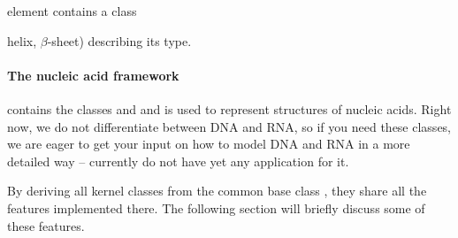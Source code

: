 element contains a class {\eg helix, $\beta$-sheet) describing its type.

\paragraph{The nucleic acid framework} contains the classes 
and  and is used to represent structures of nucleic acids.
Right now, we do not differentiate between DNA and RNA, so if you need these
classes, we are eager to get your input on how to model DNA and RNA in a more
detailed way -- currently do not have yet any application for it.

By deriving all kernel classes from the common base class ,
they share all the features implemented there. The following section will
briefly discuss some of these features.

}
